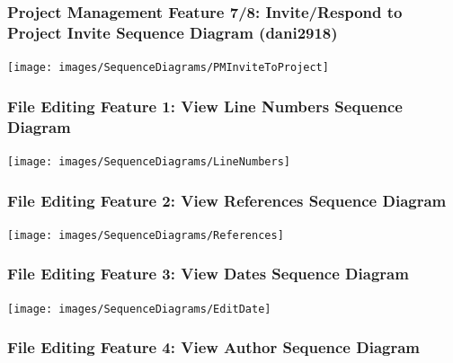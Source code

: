 \documentclass[twoside,letterpaper]{article}
\begin{document}
	\subsubsection[Project Management Feature 7/8: Invite/Respond to Project Invite Sequence Diagram (dani2918)]{\rmfamily\bfseries\color{black}
		Project Management Feature 7/8:  Invite/Respond to Project Invite Sequence Diagram (dani2918)}
	\label{pm:sd5}
	\bigskip
	
	\texttt{[image: images/SequenceDiagrams/PMInviteToProject]}
	\newpage
	
	\subsubsection[File Editing Feature 1: View Line Numbers Sequence Diagram]{\rmfamily\bfseries\color{black}
		File Editing Feature 1: View Line Numbers Sequence Diagram}
	\hypertarget{RefHeading22059017292}{}
	
	\bigskip
	
	\texttt{[image: images/SequenceDiagrams/LineNumbers]}
	
	\newpage
	
	\subsubsection[File Editing Feature 2: View References Sequence Diagram]{\rmfamily\bfseries\color{black}
		File Editing Feature 2: View References Sequence Diagram}
	\hypertarget{RefHeading22059017292}{}
	
	\bigskip
	
	\texttt{[image: images/SequenceDiagrams/References]}
	
	\newpage
	
	
	\subsubsection[File Editing Feature 3: View Dates Sequence Diagram]{\rmfamily\bfseries\color{black}
		File Editing Feature 3: View Dates Sequence Diagram}
	\hypertarget{RefHeading22059017292}{}
	
	\bigskip
	
	\texttt{[image: images/SequenceDiagrams/EditDate]}
	
	\newpage
	
	\subsubsection[File Editing Feature 4: View Author Sequence Diagram]{\rmfamily\bfseries\color{black}
		File Editing Feature 4: View Author Sequence Diagram}
	\hypertarget{RefHeading22059017292}{}
	
\end{document}
